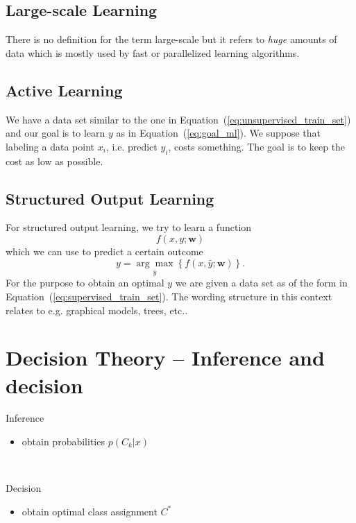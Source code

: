 \subsection{Large-scale Learning}
There is no definition for the term large-scale but it refers to \textit{huge} amounts of data which is mostly used by fast or parallelized learning algorithms. %
%
%
%
\subsection{Active Learning}
We have a data set similar to the one in Equation~(\ref{eq:unsupervised_train_set}) and our goal is to learn $y$ as in Equation~(\ref{eq:goal_ml}). %
We suppose that labeling a data point $x_i$, i.e. predict $y_i$, costs something. %
The goal is to keep the cost as low as possible. %
%
%
%
\subsection{Structured Output Learning}
For structured output learning, we try to learn a function %
\begin{equation}
f(x,y;\mathbf{w})
\label{eq:goal_structured_output_learning}
\end{equation}%
which we can use to predict a certain outcome %
\begin{equation}
y = \underset{\bar{y}}{\arg\max} \left\{ f(x,\bar{y};\mathbf{w}) \right\}.
\end{equation}
For the purpose to obtain an optimal $y$ we are given a data set as of the form in Equation~(\ref{eq:supervised_train_set}). %
The wording structure in this context relates to e.g. graphical models, trees, etc.. %
%
%
%
\section{Decision Theory -- Inference and decision}
\begin{minipage}{1\textwidth}
	\vspace*{5pt}
	\begin{minipage}[t]{.48\textwidth}
		\vspace*{5pt}
		\centerline{\Large{}Inference}
		\vspace*{5pt}
		\begin{itemize}
			\item obtain probabilities $p(C_k|x)$
		\end{itemize}
		~\\%
	\end{minipage}
	\hfill\vrule\hfill
	\begin{minipage}[t]{.48\textwidth}
		\vspace*{5pt}
		\centerline{\Large{}Decision}
		\vspace*{5pt}
		\begin{itemize}
			\item obtain optimal class assignment $C^*$
		\end{itemize}
		~\\%
	\end{minipage}
\end{minipage}
%
%
%
\clearpage
